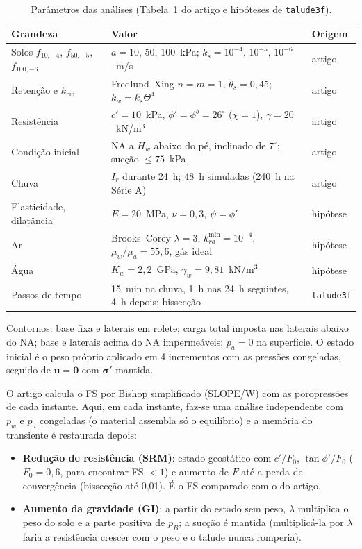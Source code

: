 \begin{table}[htbp]
\centering
\caption{Par\^ametros das an\'alises (Tabela~1 do artigo e hip\'oteses de \texttt{talude3f}).}\label{tab:par}
\small
\begin{tabular}{p{3.6cm}p{8.6cm}l}
\toprule
Grandeza & Valor & Origem\\
\midrule
Solos $f_{10,-4}$, $f_{50,-5}$, $f_{100,-6}$ & $a=10$, 50, 100~kPa; $k_s=10^{-4}$, $10^{-5}$, $10^{-6}$~m/s & artigo\\
Reten\c{c}\~ao e $k_{rw}$ & Fredlund--Xing $n=m=1$, $\theta_s=0{,}45$; $k_w=k_s\Theta^4$ & artigo\\
Resist\^encia & $c'=10$~kPa, $\phi'=\phi^b=26^\circ$ ($\chi=1$), $\gamma=20$~kN/m$^3$ & artigo\\
Condi\c{c}\~ao inicial & NA a $H_w$ abaixo do p\'e, inclinado de $7^\circ$; suc\c{c}\~ao $\le75$~kPa & artigo\\
Chuva & $I_r$ durante 24~h; 48~h simuladas (240~h na S\'erie A) & artigo\\
Elasticidade, dilat\^ancia & $E=20$~MPa, $\nu=0{,}3$, $\psi=\phi'$ & hip\'otese\\
Ar & Brooks--Corey $\lambda=3$, $k_{ra}^{\min}=10^{-4}$, $\mu_w/\mu_a=55{,}6$, g\'as ideal & hip\'otese\\
\'Agua & $K_w=2{,}2$~GPa, $\gamma_w=9{,}81$~kN/m$^3$ & hip\'otese\\
Passos de tempo & 15~min na chuva, 1~h nas 24~h seguintes, 4~h depois; bissec\c{c}\~ao & \texttt{talude3f}\\
\bottomrule
\end{tabular}
\end{table}

Contornos: base fixa e laterais em rolete; carga total imposta nas laterais abaixo do NA; base e laterais acima do
NA imperme\'aveis; $p_a=0$ na superf\'icie. O estado inicial \'e o peso pr\'oprio aplicado em 4 incrementos com as
press\~oes congeladas, seguido de $\mathbf u=\mathbf 0$ com $\boldsymbol\sigma'$ mantida.

O artigo calcula o FS por Bishop simplificado (SLOPE/W) com as poropress\~oes de cada instante. Aqui, em cada
instante, faz-se uma an\'alise independente com $p_w$ e $p_a$ congeladas (o material assembla s\'o o equil\'ibrio) e a
mem\'oria do transiente \'e restaurada depois:
\begin{itemize}
\item \textbf{Redu\c{c}\~ao de resist\^encia (SRM)}: estado geost\'atico com $c'/F_0$, $\tan\phi'/F_0$
($F_0=0{,}6$, para encontrar FS $<1$) e aumento de $F$ at\'e a perda de converg\^encia (bissec\c{c}\~ao at\'e 0,01). \'E
o FS comparado com o do artigo.
\item \textbf{Aumento da gravidade (GI)}: a partir do estado sem peso, $\lambda$ multiplica o peso do solo e a parte
positiva de $p_B$; a suc\c{c}\~ao \'e mantida (multiplic\'a-la por $\lambda$ faria a resist\^encia crescer com o peso e
o talude nunca romperia).
\end{itemize}

